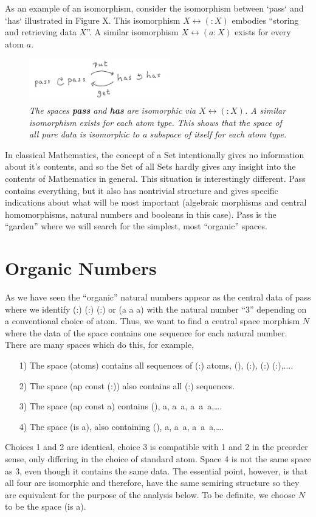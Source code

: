 \documentclass[11pt]{article}
\begin{document}
As an example of an isomorphism, consider the isomorphism between `pass` and `has` illustrated in Figure X.  
This isomorphism $X\leftrightarrow(:X)$ embodies ``storing and retrieving data $X$''.  A similar isomorphism $X\leftrightarrow(a:X)$ exists for every atom $a$.   

\begin{figure}[h]
\centering
\includegraphics[width=0.55\textwidth]{has.png}
\caption{{\it The spaces {\bf pass} and {\bf has} are isomorphic via $X\leftrightarrow (:X)$.  A similar isomorphism exists for each atom type.  This shows that the space of all pure data 
is isomorphic to a subspace of itself for each atom type.}}
\end{figure}

In classical Mathematics, the concept of a Set intentionally gives no information about it's contents, and so the Set of all Sets hardly gives any insight 
into the contents of Mathematics in general.  This situation is interestingly different.  Pass contains everything, but it also has nontrivial  
structure and gives specific indications about what will be most important (algebraic morphisms and central homomorphisms, natural numbers and booleans in this case).  Pass is the ``garden'' where we will search for the simplest, most ``organic'' spaces.  

\section{Organic Numbers}

      As we have seen the ``organic'' natural numbers appear as the central data of pass where we identify (:) (:) (:) or (a a a) with the natural number ``3'' 
 depending on a conventional choice of atom.  Thus, we want to find a central space morphism $N$ where the data of the space contains one 
 sequence for each natural number.  There are many 
spaces which do this, for example,  
\begin{itemize}
\item [1)] The space (atoms) contains all sequences of (:) atoms, (), (:), (:) (:),$\dots$. 
\item [2)] The space (ap const (:)) also contains all (:) sequences.
\item [3)] The space (ap const a) contains (), a, a\ a, a\ a\ a,\dots. 
\item [4)] The space (is a), also containing (), a, a\ a, a\ a\ a,\dots.
\end{itemize}
Choices 1 and 2 are identical, choice 3 is compatible with 1 and 2 in the preorder sense, only differing in the choice of standard atom.  Space 4 is 
not the same space as 3, even though it contains the same data.  The essential point, however, is that all four are isomorphic and therefore, have 
the same semiring structure so they are equivalent for the purpose of the analysis below.   To be definite, we choose $N$ to be the space (is a).  
     
\end{document}
